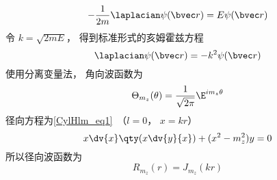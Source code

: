 
\begin{issues}
\issueDraft
\end{issues}


\begin{equation}
-\frac{1}{2m}\laplacian \psi(\bvec r) = E\psi(\bvec r)
\end{equation}
令 $k = \sqrt{2mE}$， 得到标准形式的亥姆霍兹方程
\begin{equation}
\laplacian \psi(\bvec r) = -k^2\psi(\bvec r)
\end{equation}
使用分离变量法， 角向波函数为
\begin{equation}
\Theta_{m_z}(\theta) = \frac{1}{\sqrt{2\pi}} \E^{im_z \theta}
\end{equation}
径向方程为\autoref{CylHlm_eq1}~（$l = 0$， $x = kr$）
\begin{equation}
x \dv{x} \qty(x\dv{y}{x}) + (x^2 - m_z^2)y = 0
\end{equation}
所以径向波函数为
\begin{equation}
R_{m_z}(r) = J_{m_z}(kr)
\end{equation}


